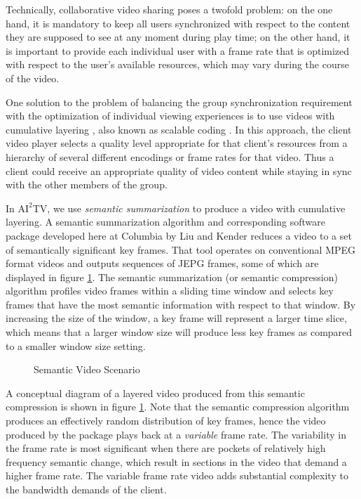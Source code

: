\documentclass{sig-alternate}
\begin{document}
Technically, collaborative video sharing poses a twofold problem: on
the one hand, it is mandatory to keep all users synchronized with
respect to the content they are supposed to see at any moment during
play time; on the other hand, it is important to provide each
individual user with a frame rate that is optimized with respect to
the user's available resources, which may vary during the course of
the video.

One solution to the problem of balancing the group synchronization
requirement with the optimization of individual viewing experiences is
to use videos with cumulative layering \cite{MCCANNE}, also known as
scalable coding \cite{LI}.  In this approach, the client video player
selects a quality level appropriate for that client's resources from a
hierarchy of several different encodings or frame rates for that
video. Thus a client could receive an appropriate quality of video
content while staying in sync with the other members of the group.



In $\mathrm{AI}^2$TV, we use {\em semantic summarization} to produce a
video with cumulative layering.  A semantic summarization algorithm
and corresponding software package developed here at Columbia by Liu
and Kender \cite{TIECHENG} reduces a video to a set of semantically
significant key frames.  That tool operates on conventional MPEG
format videos and outputs sequences of JEPG frames, some of which are
displayed in figure \ref{sem_video}.  The semantic summarization (or
semantic compression) algorithm profiles video frames within a sliding
time window and selects key frames that have the most semantic
information with respect to that window.  By increasing the size of
the window, a key frame will represent a larger time slice, which
means that a larger window size will produce less key frames as
compared to a smaller window size setting.

\begin{figure}
  \centering
  \caption{Semantic Video Scenario}
  \label{sem_video}
\end{figure} 

A conceptual diagram of a layered video produced from this semantic
compression is shown in figure \ref{sem_video}.  Note that the
semantic compression algorithm produces an effectively random
distribution of key frames, hence the video produced by the package
plays back at a {\em variable} frame rate.  The variability in the
frame rate is most significant when there are pockets of relatively
high frequency semantic change, which result in sections in the video
that demand a higher frame rate.  The variable frame rate video adds
substantial complexity to the bandwidth demands of the client.
\end{document}

